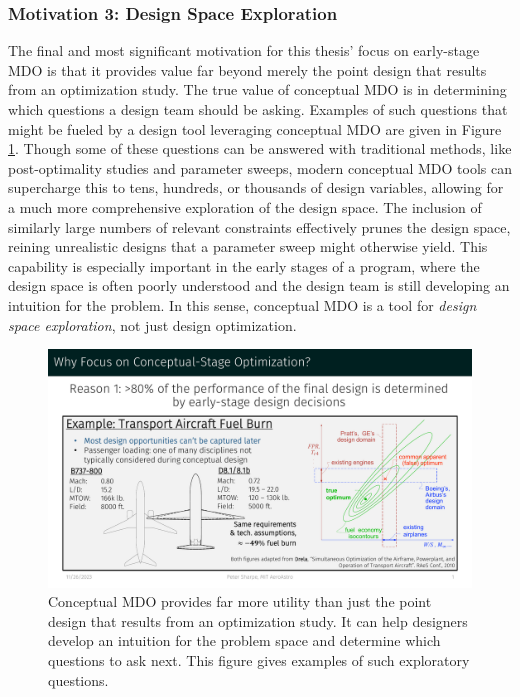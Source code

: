 \documentclass[12pt,vi,oneside,table]{report}
\begin{document}
    \afterpage{\FloatBarrier}

    \subsubsection*{Motivation 3: Design Space Exploration}

    The final and most significant motivation for this thesis' focus on early-stage MDO is that it provides value far beyond merely the point design that results from an optimization study. The true value of conceptual MDO is in determining which questions a design team should be asking. Examples of such questions that might be fueled by a design tool leveraging conceptual MDO are given in Figure \ref{fig:motivation_3}. Though some of these questions can be answered with traditional methods, like post-optimality studies and parameter sweeps, modern conceptual MDO tools can supercharge this to tens, hundreds, or thousands of design variables, allowing for a much more comprehensive exploration of the design space. The inclusion of similarly large numbers of relevant constraints effectively prunes the design space, reining unrealistic designs that a parameter sweep might otherwise yield. This capability is especially important in the early stages of a program, where the design space is often poorly understood and the design team is still developing an intuition for the problem. In this sense, conceptual MDO is a tool for \textit{design space exploration}, not just design optimization.

    \begin{figure}[H]
        \centering
        \includegraphics[page=5,trim=0cm 3cm 0cm 6.2cm, clip, width=\textwidth]{../figures/motivation_for_conceptual_MDO_focus.pdf}
        \caption{Conceptual MDO provides far more utility than just the point design that results from an optimization study. It can help designers develop an intuition for the problem space and determine which questions to ask next. This figure gives examples of such exploratory questions.}
        \label{fig:motivation_3}
    \end{figure}
\end{document}
